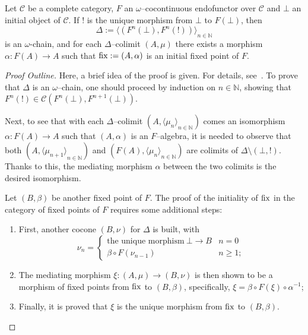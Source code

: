 \begin{thm}\label{thm:init}
  Let \(\mathcal{C}\) be a complete category, \(F\) an \(\omega{}\)--cocontinuous endofunctor over \(\mathcal{C}\) and \(\bot{}\) an initial object of \(\mathcal{C}\). If \(!{}\) is the unique morphism from \(\bot{}\) to \(F(\bot{})\), then
  \begin{equation}
    \Delta := {\langle(F^n(\bot),F^n(!))\rangle}_{n \in \mathbb{N}}
  \end{equation}
  is an \(\omega{}\)-chain, and for each \(\Delta\)--colimit \((A,\mu)\) there exists a morphism \(\alpha \colon F(A) \to A\) such that \(\operatorname{fix} := (A,\alpha)\) is an initial fixed point of \(F\).
\end{thm}
\begin{proof}[Proof Outline]
  Here, a brief idea of the proof is given. For details, see~\cite{Hemerik1988}.
  To prove that \(\Delta{}\) is an \(\omega{}\)--chain, one should proceed by induction on \(n \in \mathbb{N}\), showing that \(F^n(!) \in \mathcal{C}(F^n(\bot),F^{n+1}(\bot))\).

  Next, to see that with each \(\Delta\)--colimit \((A,{\langle\mu_n \rangle}_{n\in\mathbb{N}})\) comes an isomorphism \(\alpha \colon F(A) \to A\) such that \((A,\alpha)\) is an \(F\)--algebra, it is needed to observe that both \((A,{\langle \mu_{n+1} \rangle}_{n\in\mathbb{N}})\) and \((F(A),{\langle\mu_n \rangle}_{n\in\mathbb{N}})\) are colimits of \(\Delta \setminus (\bot,!)\).
  Thanks to this, the mediating morphism \(\alpha{}\) between the two colimits is the desired isomorphism.

  Let \((B,\beta)\) be another fixed point of \(F\). The proof of the initiality of \(\operatorname{fix}\) in the category of fixed points of \(F\) requires some additional steps:
  \begin{enumerate}
    \item First, another cocone \((B,\nu)\) for \(\Delta{}\) is built, with
    \begin{equation*}
      \nu_n =
      \begin{cases}
        \text{the unique morphism}\: \bot \to B & n = 0 \\
        \beta \circ F(\nu_{n-1}) & n \ge 1;
      \end{cases}
    \end{equation*}
    \item The mediating morphism \(\xi \colon (A,\mu) \to (B, \nu)\) is then shown to be a morphism of fixed points from \(\operatorname{fix}\) to \((B,\beta)\), specifically, \(\xi = \beta \circ F(\xi) \circ \alpha^{-1}\);
    \item Finally, it is proved that \(\xi{}\) is the unique morphism from \(\operatorname{fix}\) to \((B,\beta)\).
  \end{enumerate}
\end{proof}

